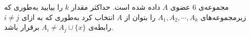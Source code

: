     \p 
مجموعه‌ی
$6$
عضوی
$A$
داده شده است. حداکثر مقدار
$k$
را بیابید به‌طوری که زیرمجموعه‌های
$A_1, A_2, \cdots, A_k$
را بتوان از
$A$
انتخاب کرد به‌طوری که به ازای
$i \neq j$
رابطه‌ی
$A_i \neq A_j \cup \{x\}$
برقرار باشد.
